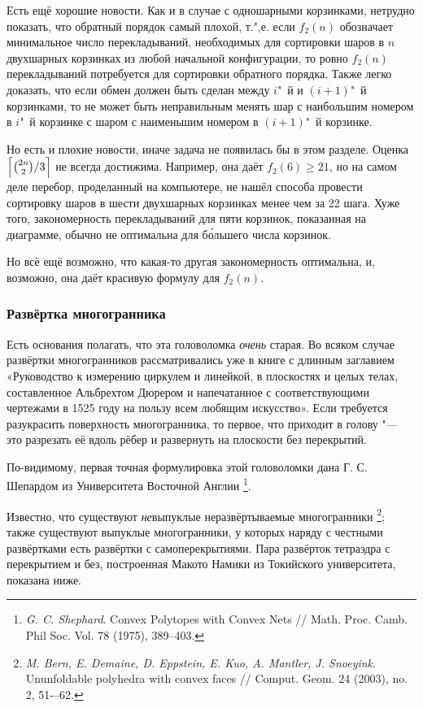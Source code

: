 \documentclass[twoside]{book}
\begin{document}
Есть ещё хорошие новости.
Как и в случае с одношарными корзинками, нетрудно показать, что обратный порядок самый плохой, т.",е. если $f_2(n)$ обозначает минимальное число перекладываний, необходимых для сортировки шаров в $n$ двухшарных корзинках из любой начальной конфигурации, то ровно $f_2(n)$ перекладываний потребуется для сортировки обратного порядка.
Также легко доказать, что если обмен должен быть сделан между $i$"~й и $(i+1)$"~й корзинками, то не может быть неправильным менять шар с наибольшим номером в $i$"~й корзинке с шаром с наименьшим номером в $(i+1)$"~й корзинке.

Но есть и плохие новости, иначе задача не появилась бы в этом разделе.
Оценка $\Bigl\lceil\binom{2n}{2}/3\Bigr\rceil$ не всегда достижима.
Например, она даёт $f_2(6)\ge 21$, но на самом деле перебор, проделанный на компьютере, не нашёл способа провести сортировку шаров в шести двухшарных корзинках менее чем за 22 шага.
Хуже того, закономерность перекладываний для пяти корзинок, показанная на диаграмме, обычно не оптимальна для б\'{о}льшего числа корзинок.

Но всё ещё возможно, что какая-то другая закономерность оптимальна, и, возможно, она даёт красивую формулу для $f_2(n)$.

\subsubsection*{Развёртка многогранника}

Есть основания полагать, что эта головоломка \emph{очень} старая. 
Во всяком случае развёртки многогранников рассматривались уже в книге с длинным заглавием «Руководство к измерению циркулем и линейкой, в плоскостях и целых телах, составленное Альбрехтом Дюрером и напечатанное с соответствующими чертежами в 1525 году на пользу всем любящим искусство».
Если требуется разукрасить поверхность многогранника, то первое, что приходит в голову "--- это разрезать её вдоль рёбер и развернуть на плоскости без перекрытий.

По-видимому, первая точная формулировка этой головоломки дана Г. С. Шепардом из Университета Восточной Англии%
\footnote{\emph{G. C. Shephard}. Convex Polytopes with Convex Nets /\!/ {Math. Proc. Camb. Phil Soc.} Vol. 78 (1975), 389--403.}.
 
Известно, что существуют \emph{не}выпуклые неразвёртываемые многогранники%
\footnote{\emph{M. Bern, E. Demaine, D. Eppstein, E. Kuo, A. Mantler, J. Snoeyink}. 
  Ununfoldable poly\-hedra with convex faces /\!/
  {Comput. Geom.} 24 (2003), no. 2, 51-–62.};
также существуют выпуклые многогранники, у которых наряду с честными развёртками есть развёртки с самоперекрытиями. 
Пара развёрток тетраэдра с перекрытием и без, построенная Макото Намики из Токийского университета, показана ниже.
\end{document}
